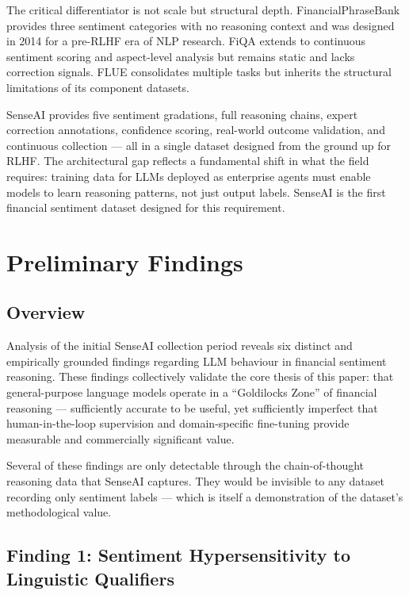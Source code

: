 \documentclass[11pt,a4paper]{article}
\begin{document}
The critical differentiator is not scale but structural depth. FinancialPhraseBank
provides three sentiment categories with no reasoning context and was designed in
2014 for a pre-RLHF era of NLP research. FiQA extends to continuous sentiment
scoring and aspect-level analysis but remains static and lacks correction signals. FLUE
consolidates multiple tasks but inherits the structural limitations of its component
datasets.

SenseAI provides five sentiment gradations, full reasoning chains, expert correction
annotations, confidence scoring, real-world outcome validation, and continuous
collection --- all in a single dataset designed from the ground up for RLHF. The
architectural gap reflects a fundamental shift in what the field requires: training data
for LLMs deployed as enterprise agents must enable models to learn reasoning
patterns, not just output labels. SenseAI is the first financial sentiment dataset
designed for this requirement.

\section{Preliminary Findings}
\label{sec:findings}

\subsection{Overview}

Analysis of the initial SenseAI collection period reveals six distinct and empirically
grounded findings regarding LLM behaviour in financial sentiment reasoning. These
findings collectively validate the core thesis of this paper: that general-purpose
language models operate in a ``Goldilocks Zone'' of financial reasoning --- sufficiently
accurate to be useful, yet sufficiently imperfect that human-in-the-loop supervision
and domain-specific fine-tuning provide measurable and commercially significant value.

Several of these findings are only detectable through the chain-of-thought reasoning
data that SenseAI captures. They would be invisible to any dataset recording only
sentiment labels --- which is itself a demonstration of the dataset's methodological
value.

\subsection{Finding 1: Sentiment Hypersensitivity to Linguistic Qualifiers}
\end{document}
